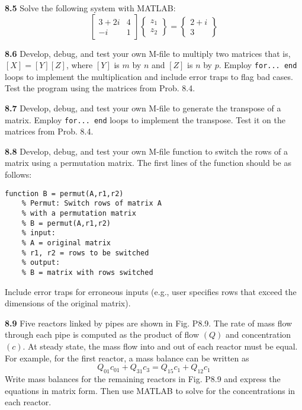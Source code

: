 \documentclass[../main.tex]{subfiles}
\begin{document}
\begin{multicols}{2}
    \noindent \textbf{8.5} Solve the following system with MATLAB:
    $$
    \left[\begin{array}{cc}
    3+2 i & 4 \\
    -i & 1
    \end{array}\right]\left\{\begin{array}{l}
    z_{1} \\
    z_{2}
    \end{array}\right\}=\left\{\begin{array}{c}
    2+i \\
    3
    \end{array}\right\}
    $$
    
    \noindent \textbf{8.6} Develop, debug, and test your own M-file to multiply two matrices that is, $[X]=[Y][Z]$, where $[Y]$ is $m$ by $n$ and $[Z]$ is $n$ by $p$. Employ \texttt{for... end} loops to implement the multiplication and include error traps to flag bad cases. Test the program using the matrices from Prob. 8.4.
    
    \noindent \textbf{8.7} Develop, debug, and test your own M-file to generate the transpose of a matrix. Employ \texttt{for... end} loops to implement the transpose. Test it on the matrices from Prob. 8.4.
    
    \noindent \textbf{8.8} Develop, debug, and test your own M-file function to switch the rows of a matrix using a permutation matrix. The first lines of the function should be as follows:
    
    \begin{lstlisting}[numbers=none,frame=none]
    function B = permut(A,r1,r2)
    % Permut: Switch rows of matrix A
    % with a permutation matrix
    % B = permut(A,r1,r2)
    % input:
    % A = original matrix
    % r1, r2 = rows to be switched
    % output:
    % B = matrix with rows switched
	\end{lstlisting}

    Include error traps for erroneous inputs (e.g., user specifies rows that exceed the dimensions of the original matrix).
    
    \noindent \textbf{8.9} Five reactors linked by pipes are shown in Fig. P8.9. The rate of mass flow through each pipe is computed as the product of flow $(Q)$ and concentration $(c)$. At steady state, the mass flow into and out of each reactor must be equal. For example, for the first reactor, a mass balance can be written as
    $$
    Q_{01} c_{01}+Q_{31} c_{3}=Q_{15} c_{1}+Q_{12} c_{1}
    $$
    Write mass balances for the remaining reactors in Fig. P8.9 and express the equations in matrix form. Then use MATLAB to solve for the concentrations in each reactor.
    

\end{multicols}
\end{document}
